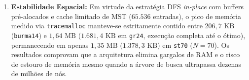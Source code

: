 \begin{enumerate}
    \item \textbf{Estabilidade Espacial:} Em virtude da estratégia DFS \textit{in-place} com buffers pré-alocados e cache limitado de MST ($65.536$ entradas), o pico de memória medido via \texttt{tracemalloc} manteve-se estritamente contido entre $206{,}7\text{ KB}$ (\texttt{burma14}) e $1{,}64\text{ MB}$ ($1.681{,}4\text{ KB}$ em \texttt{gr24}, execução completa até o ótimo), permanecendo em apenas $1{,}35\text{ MB}$ ($1.378{,}3\text{ KB}$) em \texttt{st70} ($N=70$). Os resultados comprovam que a arquitetura elimina gargalos de RAM e o risco de estouro de memória mesmo quando a árvore de busca ultrapassa dezenas de milhões de nós.
\end{enumerate}
